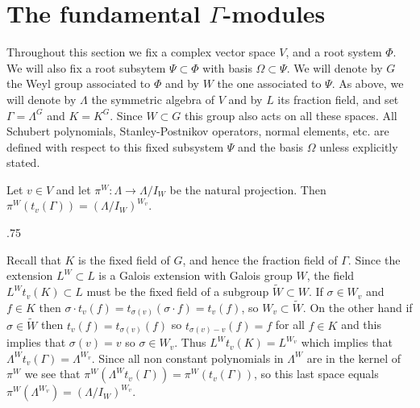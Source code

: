 \documentclass[11pt,fleqn]{amsart}
\makeatletter
\renewcommand\proofname{Proof}
\renewenvironment{proof}[1][\textit{\proofname}]{\par
 \pushQED{\qed}%
 \normalfont \topsep.75\paraskip\relax
 \trivlist
 \item[\hskip\labelsep
 \itshape
 #1\@addpunct{.}]\ignorespaces
}{%
 \popQED\endtrivlist\@endpefalse
}
\newcounter{para}[section]
\renewcommand\to{\longrightarrow}
\makeatother
\begin{document}

\section{The fundamental $\Gamma$-modules}
Throughout this section we fix a complex vector space $V$, and a root system
$\Phi$. We will also fix a root subsytem $\Psi \subset \Phi$ with basis 
$\Omega \subset \Psi$. We will denote by $G$ the Weyl group associated to 
$\Phi$ and by $W$ the one associated to $\Psi$. As above, we will denote by
$\Lambda$ the symmetric algebra of $V$ and by $L$ its fraction field, and set
$\Gamma = \Lambda^G$ and $K = K^G$. Since $W \subset G$ this group also acts
on all these spaces. All Schubert polynomials, Stanley-Postnikov operators,
normal elements, etc. are defined with respect to this fixed subsystem 
$\Psi$ and the basis $\Omega$ unless explicitly stated.

\begin{Lemma}
\label{L:translation}
Let $v \in V$ and let $\pi^W: \Lambda \to \Lambda/I_W$ be the natural 
projection. Then $\pi^W(t_v(\Gamma)) = (\Lambda/I_W)^{W_v}$.
\end{Lemma}
\begin{proof}
Recall that $K$ is the fixed field of $G$, and hence the fraction field of 
$\Gamma$. Since the extension $L^W \subset L$ is a Galois extension with 
Galois group $W$, the field $L^W t_v(K) \subset L$ must be the fixed field
of a subgroup $\widetilde W \subset W$. If $\sigma \in W_v$ and $f \in K$ then
$\sigma \cdot t_v(f) = t_{\sigma(v)} (\sigma \cdot f) = t_v(f)$, so $W_v 
\subset \widetilde W$. On the other hand if $\sigma \in \widetilde W$ then $t_v(f)
= t_{\sigma(v)}(f)$ so $t_{\sigma(v) - v}(f) = f$ for all $f \in K$ and this
implies that $\sigma(v) = v$ so $\sigma \in W_v$. Thus $L^W t_v(K) = L^{W_v}$
which implies that $\Lambda^{W} t_v(\Gamma) = \Lambda^{W_v}$. Since all non
constant polynomials in $\Lambda^W$ are in the kernel of $\pi^W$ we see that
$\pi^W(\Lambda^W t_v(\Gamma)) = \pi^W(t_v(\Gamma))$, so this last space equals
$\pi^W(\Lambda^{W_v}) = (\Lambda/I_W)^{W_v}$.
\end{proof}
\end{document}

